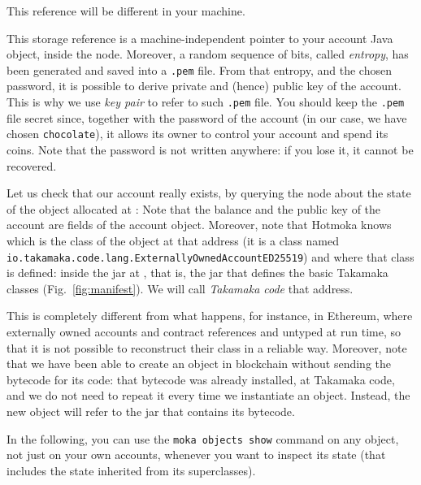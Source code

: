%
\begin{commentbox}
  This reference will be different in your machine.
\end{commentbox}
%
This storage reference is a machine-independent pointer to your account Java object, inside
the node. Moreover, a random sequence of bits, called \emph{entropy}, has been generated
and saved into a \texttt{.pem} file. From that entropy, and the chosen password, it is possible
to derive private and (hence) public key of the account. This is why we use
\emph{key pair} to refer to such \texttt{.pem} file.
You should keep the \texttt{.pem} file secret since, together with the
password of the account (in our case, we have chosen \texttt{chocolate}),
it allows its owner to control your account and spend its coins.
Note that the password is not written anywhere: if you lose it, it cannot be recovered.

Let us check that our account really exists,
by querying the node about the state of the object allocated at \texttt{\accountOne}:
%
%
Note that the balance and the public key of the account are
fields of the account object. Moreover, note that Hotmoka knows
which is the class of the object at that address
(it is a class named \texttt{io.takamaka.code.lang.ExternallyOwnedAccountED25519})
and where that class is defined: inside the jar
at \texttt{\takamakaCode}, that is, the jar that defines
the basic Takamaka classes (Fig.~\ref{fig:manifest}).
We will call \emph{Takamaka code} that address.

\begin{commentbox}
This is completely different from what happens, for instance,
in Ethereum, where externally owned accounts and contract references and untyped at run time,
so that it is not possible to reconstruct their class in a reliable way.
Moreover, note that we have been able to create an object in blockchain
without sending the bytecode for its code: that bytecode was
already installed, at Takamaka code, and we do not
need to repeat it every time we instantiate an object. Instead, the new object
will refer to the jar that contains its bytecode.
\end{commentbox}

In the following, you can use the \texttt{moka objects show} command on any object,
not just on your own accounts, whenever you want to inspect its state
(that includes the state inherited from its superclasses).

